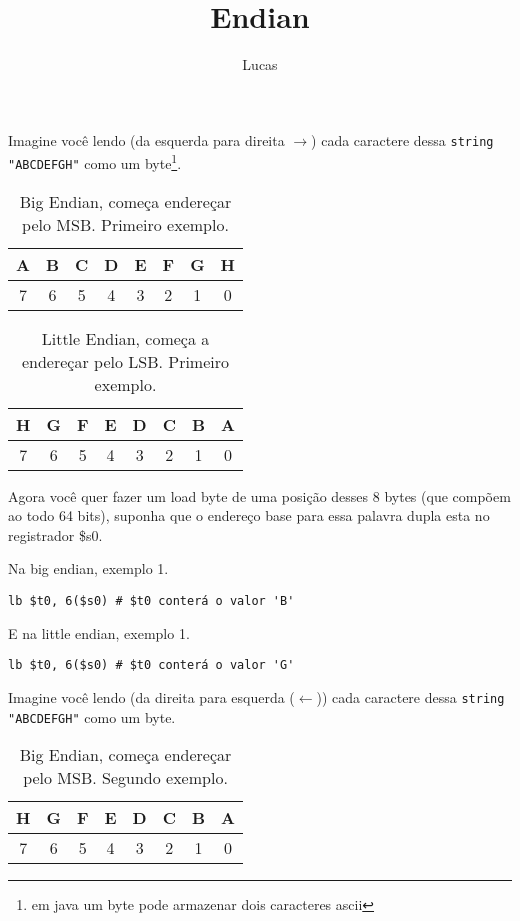 \documentclass{article}
\author{Lucas}
\title{Endian}
\begin{document}
\maketitle

Imagine você lendo (da esquerda para direita $\rightarrow$) cada caractere dessa
\verb|string "ABCDEFGH"| como um byte\footnote{em java um byte pode armazenar 
dois caracteres ascii}.

\begin{table}[ht!]
  \centering
  \begin{tabular}{|c|c|c|c|c|c|c|c|}
  \hline A & B & C & D & E & F & G & H \\ 
  \hline 7 & 6 & 5 & 4 & 3 & 2 & 1 & 0 \\ 
  \hline 
  \end{tabular}
  \caption{Big Endian, começa endereçar pelo MSB. Primeiro exemplo.}
\end{table}

\begin{table}[ht!]
  \centering
  \begin{tabular}{|c|c|c|c|c|c|c|c|}
  \hline H & G & F & E & D & C & B & A \\ 
  \hline 7 & 6 & 5 & 4 & 3 & 2 & 1 & 0 \\ 
  \hline 
  \end{tabular}
  \caption{Little Endian, começa a endereçar pelo LSB. Primeiro exemplo.}
\end{table}

Agora você quer fazer um load byte de uma posição desses 8 bytes (que compõem 
ao todo 64 bits), suponha que o endereço base para essa palavra dupla esta no 
registrador \$s0.

Na big endian, exemplo 1.

\begin{verbatim}
lb $t0, 6($s0) # $t0 conterá o valor 'B'
\end{verbatim}

E na little endian, exemplo 1.

\begin{verbatim}
lb $t0, 6($s0) # $t0 conterá o valor 'G'
\end{verbatim}

Imagine você lendo (da direita para esquerda ($\leftarrow$)) cada caractere 
dessa \verb|string "ABCDEFGH"| como um byte.

\begin{table}[ht!]
  \centering
  \begin{tabular}{|c|c|c|c|c|c|c|c|}
  \hline H & G & F & E & D & C & B & A \\ 
  \hline 7 & 6 & 5 & 4 & 3 & 2 & 1 & 0 \\ 
  \hline 
  \end{tabular}
  \caption{Big Endian, começa endereçar pelo MSB. Segundo exemplo.}
\end{table}
\end{document}
